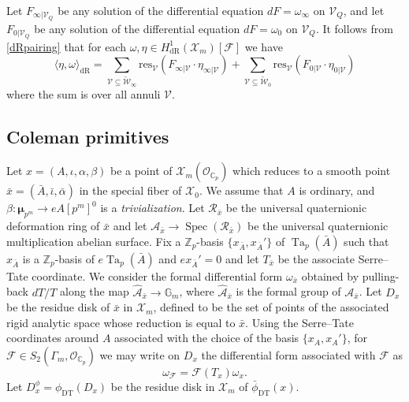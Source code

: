 \documentclass[a4paper,11pt]{amsart}
\numberwithin{equation}{section}
\theoremstyle{plain}
\theoremstyle{definition}
\theoremstyle{remark}
\newcommand{\Z}{\mathbb Z}
\newcommand{\C}{\mathbb C}
\newcommand{\G}{\mathbb G}
\DeclareMathOperator{\Spec}{Spec}
\DeclareMathOperator{\Ta}{Ta}
\newcommand{\dR}{\mathrm{dR}}
\begin{document}
Let $F_{\infty|\mathcal{V}_Q}$ be any solution of the differential equation $dF=\omega_{\infty}$ on $\mathcal{V}_Q$, and let $F_{0|\mathcal{V}_Q}$ be any solution of the differential equation $dF=\omega_{0}$ on $\mathcal{V}_Q$.
It follows from \eqref{dRpairing} 
that for each $\omega,\eta\in H^1_\mathrm{dR}(\mathscr{X}_m)[\mathcal{F}]$ we have 
\begin{equation}\label{pairing-residues} 
\langle\eta,\omega\rangle_\dR= \sum_{\mathcal{V}\subseteq\widetilde{\mathcal{W}}_\infty}\mathrm{res}_\mathcal{V}(F_{\infty|\mathcal{V}}\cdot \eta_{\infty|\mathcal{V}})+ 
\sum_{\mathcal{V}\subseteq\widetilde{\mathcal{W}}_0}\mathrm{res}_\mathcal{V}(F_{0|\mathcal{V}}\cdot \eta_{0|\mathcal{V}})\end{equation}
where the sum is over all annuli $\mathcal{V}$. 

\subsection{Coleman primitives}

Let $x=({A},\iota,\alpha,\beta)$ be a point of ${\mathcal{X}}_m(\mathcal{O}_{\C_p})$ which reduces to a smooth point $\bar{x}=(\bar{A},\bar\iota,\bar\alpha)$ in the special fiber of $\mathcal{X}_0$.
We assume that $A$ is ordinary, and $\beta\colon\boldsymbol{\mu}_{p^m}\rightarrow eA[p^m]^0$ is a \emph{trivialization}.
Let $\mathcal{R}_{\bar{x}}$ be the universal quaternionic deformation ring of $\bar{x}$ and let $\mathcal{A}_{\bar{x}}\rightarrow \Spec(\mathcal{R}_{\bar{x}})$ be the universal quaternionic multiplication abelian surface.  
Fix a $\Z_p$-basis $\{x_{\bar{A}},x_{\bar{A}}'\}$ of $\Ta_p(\bar{A})$ such that $x_{\bar{A}}$ is a $\Z_p$-basis of $e\Ta_p({\bar{A}})$ and $ex_{\bar{A}}'=0$ and let $T_{\bar{x}}$ be the associate Serre--Tate coordinate. 
We consider the formal differential form 
$\omega_{\bar{x}}$ obtained by pulling-back $dT/T$ along the map $\widehat{\mathcal{A}}_{\bar x}\rightarrow \G_m$, where $\widehat{\mathcal{A}}_{\bar x}$ is the formal group  of 
${\mathcal{A}}_{\bar x}$. 
Let $D_x$ be the residue disk of $\bar x$ in ${\mathcal{X}}_m$, defined to be the set of points of the associated rigid analytic space whose reduction is equal to $\bar{x}$.  
Using the Serre--Tate coordinates around $A$ associated with the choice of the basis $\{x_A,x_A'\}$, for $\mathcal{F}\in S_2(\Gamma_m,\mathcal{O}_{\C_p})$ we may write on $D_x$ the differential form associated with $\mathcal{F}$ as 
\begin{equation}\label{diff}
\omega_\mathcal{F}=\mathcal{F}(T_x)\omega_x.\end{equation}
Let   $D_x^\phi=\phi_{\mathrm{DT}}(D_x)$ be the residue disk in ${\mathcal{X}}_m$ of $\bar\phi_{\mathrm{DT}}(x)$.  
\end{document}
